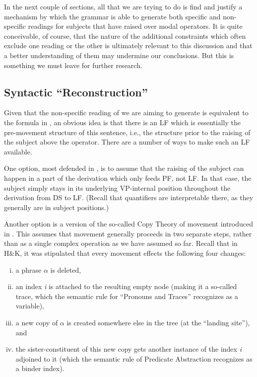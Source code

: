 In the next couple of sections, all that we are trying to do is find and justify
a mechanism by which the grammar is able to generate both specific and
non-specific readings for subjects that have raised over modal operators. It is
quite conceivable, of course, that the nature of the additional constraints
which often exclude one reading or the other is ultimately relevant to this
discussion and that a better understanding of them may undermine our
conclusions. But this is something we must leave for further research.

\subsection{Syntactic ``Reconstruction''}

Given that the non-specific reading of  we are aiming to generate is
equivalent to the formula in , an obvious idea is that there is an
LF which is essentially the pre-movement structure of this sentence, i.e., the
structure prior to the raising of the subject above the operator. There are a
number of ways to make such an LF available.

One option, most defended in \citet{sauerland-elbourne-2002-total}, is to assume
that the raising of the subject can happen in a part of the derivation which
only feeds PF, not LF. In that case, the subject simply stays in its underlying
VP-internal position throughout the derivation from DS to LF. (Recall that
quantifiers are interpretable there, as they generally are in subject
positions.)

Another option is a version of the so-called Copy Theory of movement introduced
in \citet{chomsky-1993-minimalist}. This assumes that movement generally
proceeds in two separate steps, rather than as a single complex operation as we
have assumed so far. Recall that in H\&K, it was stipulated that every
movement effects the following four changes:

\begin{enumerate}
	[(i)] 
\item a phrase $\alpha$ is deleted,
\item an index \emph{i} is attached to the resulting empty node (making it a
  so-called trace, which the semantic rule for ``Pronouns and Traces''
  recognizes as a variable),
\item a new copy of $\alpha$ is created somewhere else in the tree (at the
  ``landing site''), and
\item the sister-constituent of this new copy gets another instance of the index
  \emph{i} adjoined to it (which the semantic rule of Predicate Abstraction
  recognizes as a binder index).
\end{enumerate}


